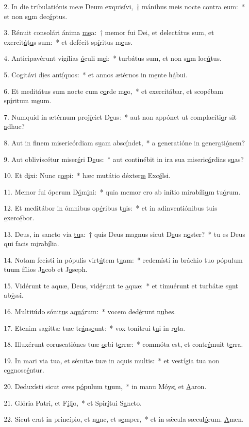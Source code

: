 2. In die tribulatiónis meæ Deum exqui\uline{sí}vi,~† mánibus meis nocte c\uline{o}ntra \uline{e}um:~* et non s\uline{u}m dec\uline{é}ptus.\par 
3. Rénuit consolári ánima \uline{me}a:~† memor fui Dei, et delectátus sum, et exercit\uline{á}t\uline{u}s sum:~* et defécit sp\uline{í}ritus m\uline{e}us.\par 
4. Anticipavérunt vigílias \uline{ó}culi m\uline{e}i:~* turbátus sum, et non s\uline{u}m loc\uline{ú}tus.\par 
5. Cogitávi d\uline{i}es ant\uline{í}quos:~* et annos ætérnos in m\uline{e}nte h\uline{á}bui.\par 
6. Et meditátus sum nocte cum c\uline{o}rde m\uline{e}o,~* et exercitábar, et scopébam sp\uline{í}ritum m\uline{e}um.\par 
7. Numquid in ætérnum proj\uline{í}ciet D\uline{e}us:~* aut non appónet ut complacíti\uline{o}r sit \uline{a}dhuc?\par 
8. Aut in finem misericórdiam s\uline{u}am absc\uline{í}ndet,~* a generatióne in gener\uline{a}ti\uline{ó}nem?\par 
9. Aut obliviscétur miser\uline{é}ri D\uline{e}us:~* aut continébit in ira sua miseric\uline{ó}rdias s\uline{u}as?\par 
10. Et d\uline{i}xi: Nunc c\uline{œ}pi:~* hæc mutátio déxter\uline{æ} Exc\uline{é}lsi.\par 
11. Memor fui óperum D\uline{ó}m\uline{i}ni:~* quia memor ero ab inítio mirabíli\uline{u}m tu\uline{ó}rum.\par 
12. Et meditábor in ómnibus op\uline{é}ribus t\uline{u}is:~* et in adinventiónibus tuis \uline{e}xerc\uline{é}bor.\par 
13. Deus, in sancto via \uline{tu}a:~† quis Deus magnus sicut D\uline{e}us n\uline{o}ster?~* tu es Deus qui facis m\uline{i}rab\uline{í}lia.\par 
14. Notam fecísti in pópulis virt\uline{ú}tem t\uline{u}am:~* redemísti in bráchio tuo pópulum tuum fílios J\uline{a}cob et J\uline{o}seph.\par 
15. Vidérunt te aquæ, Deus, vid\uline{é}runt te \uline{a}quæ:~* et timuérunt et turbátæ s\uline{u}nt ab\uline{ý}ssi.\par 
16. Multitúdo sónit\uline{u}s a\uline{quá}rum:~* vocem ded\uline{é}runt n\uline{u}bes.\par 
17. Etenim sagíttæ tuæ tr\uline{á}ns\uline{e}unt:~* vox tonítrui t\uline{u}i in r\uline{o}ta.\par 
18. Illuxérunt coruscatiónes tuæ \uline{o}rbi t\uline{e}rræ:~* commóta est, et contr\uline{é}muit t\uline{e}rra.\par 
19. In mari via tua, et sémitæ tuæ in \uline{a}quis m\uline{u}ltis:~* et vestígia tua non c\uline{o}gnosc\uline{é}ntur.\par 
20. Deduxísti sicut oves p\uline{ó}pulum t\uline{u}um,~* in manu Móys\uline{i} et \uline{A}aron.\par 
21. Glória Patri, et F\uline{í}l\uline{i}o,~* et Spir\uline{í}tui S\uline{a}ncto.\par 
22. Sicut erat in princípio, et n\uline{u}nc, et s\uline{e}mper,~* et in sǽcula sæcul\uline{ó}rum. \uline{A}men.\par 
